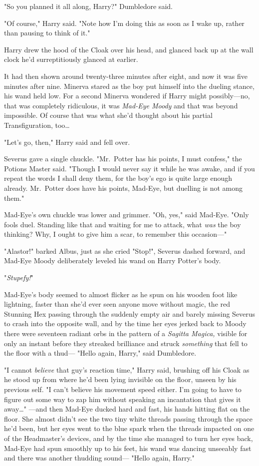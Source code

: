"So you planned it all along, Harry?" Dumbledore said.

"Of course," Harry said. "Note how I'm doing this as soon as I wake up, rather 
than pausing to think of it."

Harry drew the hood of the Cloak over his head, and glanced back up at the wall 
clock he'd surreptitiously glanced at earlier.

It had then shown around twenty-three minutes after eight, and now it was five 
minutes after nine.
\sbreak
Minerva stared as the boy put himself into the dueling stance, his wand held 
low. For a second Minerva wondered if Harry might possibly---no, that was 
completely ridiculous, it was \emph{Mad-Eye Moody} and that was beyond 
impossible. Of course that was what she'd thought about his partial 
Transfiguration, too{\ldots}

"Let's go, then," Harry said and fell over.

Severus gave a single chuckle. "Mr.~Potter has his points, I must confess," the 
Potions Master said. "Though I would never say it while he was awake, and if 
you repeat the words I shall deny them, for the boy's ego is quite large enough 
already. Mr.~Potter does have his points, Mad-Eye, but duelling is not among 
them."

Mad-Eye's own chuckle was lower and grimmer. "Oh, yes," said Mad-Eye. "Only 
fools duel. Standing like that and waiting for me to attack, what \emph{was} 
the boy thinking? Why, I ought to give him a scar, to remember this occasion---"

"Alastor!" barked Albus, just as she cried "Stop!", Severus dashed forward, and 
Mad-Eye Moody deliberately leveled his wand on Harry Potter's body.

"\emph{Stupefy!}"

Mad-Eye's body seemed to almost flicker as he spun on his wooden foot like 
lightning, faster than she'd ever seen anyone move without magic, the red 
Stunning Hex passing through the suddenly empty air and barely missing Severus 
to crash into the opposite wall, and by the time her eyes jerked back to Moody 
there were seventeen radiant orbs in the pattern of a \emph{Sagitta Magica,} 
visible for only an instant before they streaked brilliance and struck 
\emph{something} that fell to the floor with a thud---
\sbreak
"Hello again, Harry," said Dumbledore.

"I cannot \emph{believe} that guy's reaction time," Harry said, brushing off 
his Cloak as he stood up from where he'd been lying invisible on the floor, 
unseen by his previous self. "I can't believe his movement speed either. I'm 
going to have to figure out some way to zap him without speaking an incantation 
that gives it away{\ldots}"
\sbreak
---and then Mad-Eye ducked hard and fast, his hands hitting flat on the floor. 
She almost didn't see the two tiny white threads passing through the space he'd 
been, but her eyes went to the blue spark when the threads impacted on one of 
the Headmaster's devices, and by the time she managed to turn her eyes back, 
Mad-Eye had spun smoothly up to his feet, his wand was dancing unseeably fast 
and there was another thudding sound---
\sbreak
"Hello again, Harry."

